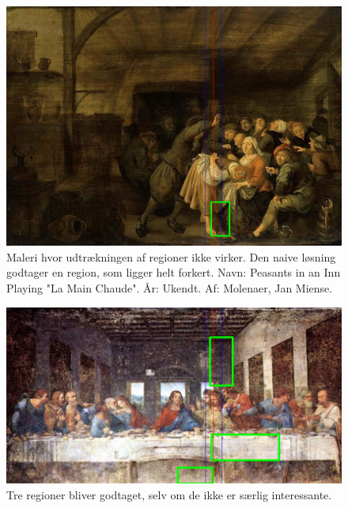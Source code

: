 \begin{figure}[h!!]
	\begin{center}
		\includegraphics[scale=0.3,angle=0]{afsnit/afprovning/billeder/naive_losning/naiv_virker_ikke1.png}
	\end{center}
	\caption[]{Maleri hvor udtrækningen af regioner ikke virker. Den naive
	løsning godtager en region, som ligger helt forkert. Navn:
	Peasants in an Inn Playing "La Main Chaude". År: Ukendt. Af:
	Molenaer, Jan Miense.}
	\label{naiv_virker_ikke1}
\end{figure}

\begin{figure}[h!!]
	\begin{center}
		\includegraphics[scale=0.3,angle=0]{afsnit/afprovning/billeder/naive_losning/naiv_virker_ikke2.png}
	\end{center}
	\caption[]{Tre regioner bliver godtaget, selv om de ikke er særlig
	interessante.}
	\label{naiv_virker_ikke2}
\end{figure}

